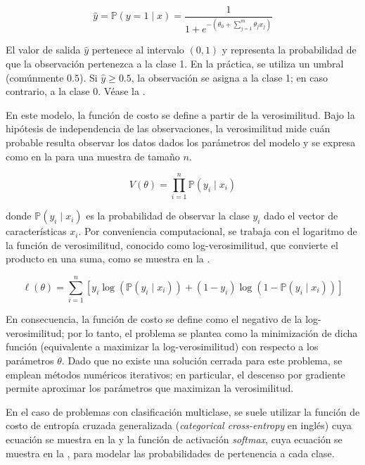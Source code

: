 \begin{equation}
    \label{eq:logistic_regression}
    \hat{y} = \mathbb{P}\left(y=1 \mid x\right)  = \frac{1}{1 + e^{-\left(\theta_0 + \sum_{j=1}^{m} \theta_j x_j\right)}}
\end{equation}

El valor de salida $\hat{y}$ pertenece al intervalo $(0, 1)$ y representa la probabilidad de que la observación pertenezca a la clase 1. En la práctica, se utiliza un umbral (comúnmente $0.5$). Si $\hat{y} \geq 0.5$, la observación se asigna a la clase 1; en caso contrario, a la clase 0. Véase la .


En este modelo, la función de costo se define a partir de la verosimilitud. Bajo la hipótesis de independencia de las observaciones, la verosimilitud mide cuán probable resulta observar los datos dados los parámetros del modelo y se expresa como en la  para una muestra de tamaño $n$.

\begin{equation}
    \label{eq:likelihood}
      V(\theta) = \prod_{i=1}^{n} \mathbb{P}(y_i \mid x_i)
\end{equation}

donde $\mathbb{P}(y_i \mid x_i)$ es la probabilidad de observar la clase $y_i$ dado el vector de características $x_i$. Por conveniencia computacional, se trabaja con el logaritmo de la función de verosimilitud, conocido como log-verosimilitud, que convierte el producto en una suma, como se muestra en la .

\begin{equation}
    \label{eq:log_likelihood}
      \ell(\theta) = \sum_{i=1}^{n} \left[ y_i \log(\mathbb{P}(y_i \mid x_i)) + (1 - y_i) \log(1 - \mathbb{P}(y_i \mid x_i)) \right]
\end{equation}

En consecuencia, la función de costo se define como el negativo de la log-verosimilitud; por lo tanto, el problema se plantea como la minimización de dicha función (equivalente a maximizar la log-verosimilitud) con respecto a los parámetros $\theta$. Dado que no existe una solución cerrada para este problema, se emplean métodos numéricos iterativos; en particular, el descenso por gradiente permite aproximar los parámetros que maximizan la verosimilitud.

En el caso de problemas con clasificación multiclase, se suele utilizar la función de costo de entropía cruzada generalizada (\textit{categorical cross-entropy} en inglés) cuya ecuación se muestra en la  y la función de activación \textit{softmax}, cuya ecuación se muestra en la , para modelar las probabilidades de pertenencia a cada clase.

